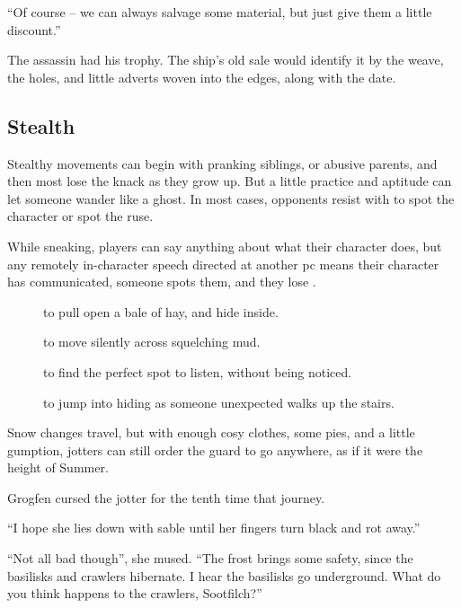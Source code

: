 \begin{multicols}{2}
\begin{exampletext}
  ``Of course -- we can always salvage some material, but just give them a little discount.''

  The assassin had his trophy.
  The ship's old sale would identify it by the weave, the holes, and little adverts woven into the edges, along with the date.

\end{exampletext}

\subsection{Stealth}

Stealthy movements can begin with pranking siblings, or abusive parents, and then most lose the knack as they grow up.
But a little practice and aptitude can let someone wander like a ghost.
In most cases, opponents resist with  to spot the character or spot the ruse.

While sneaking, players can say anything about what their character does, but any remotely in-character speech directed at another \gls{pc} means their character has communicated, someone spots them, and they lose .

\begin{description}
  \item[]
    to pull open a bale of hay, and hide inside.
  \item[]
    to move silently across squelching mud.
  \item[]
    to find the perfect spot to listen, without being noticed.
  \item[]
    to jump into hiding as someone unexpected walks up the stairs.
\end{description}

\begin{exampletext}
  Snow changes travel, but with enough cosy clothes, some pies, and a little gumption, \glspl{jotter} can still order the \gls{guard} to go anywhere, as if it were the height of Summer.

  Grogfen cursed the \gls{jotter} for the tenth time that journey.

  ``I hope she lies down with \gls{sable} until her fingers turn black and rot away.''

  ``Not all bad though'', she mused.
  ``The frost brings some safety, since the \glspl{basilisk} and \glspl{crawler} hibernate.
  I hear the \glspl{basilisk} go underground.
  What do you think happens to the \glspl{crawler}, Sootfilch?''


\end{exampletext}
\end{multicols}
